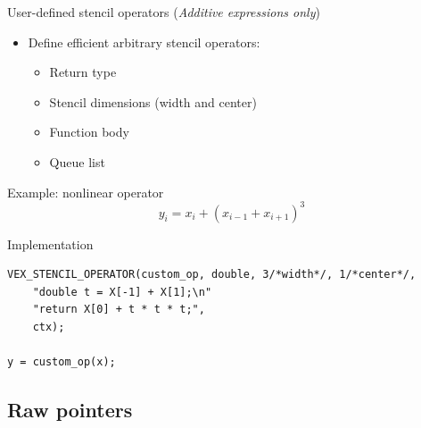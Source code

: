 \documentclass[@BEAMER_OPTIONS@]{beamer}
\newcommand{\additive}{\hspace{1cm}\footnotesize(\emph{Additive expressions only})}
\begin{document}
\begin{frame}[fragile]{User-defined stencil operators \additive}
    \begin{itemize}
        \item Define efficient arbitrary stencil operators:
            \begin{itemize}
                \item Return type
                \item Stencil dimensions (width and center)
                \item Function body
                \item Queue list
            \end{itemize}
    \end{itemize}
    \begin{block}{Example: nonlinear operator}
        \begin{equation*}
            y_i = x_i + \left( x_{i-1} + x_{i+1} \right)^3
        \end{equation*}
    \end{block}
    \begin{exampleblock}{Implementation}
        \begin{lstlisting}
VEX_STENCIL_OPERATOR(custom_op, double, 3/*width*/, 1/*center*/,
    "double t = X[-1] + X[1];\n"
    "return X[0] + t * t * t;",
    ctx);

y = custom_op(x);
        \end{lstlisting}
    \end{exampleblock}
\end{frame}


\subsection{Raw pointers}
\end{document}
